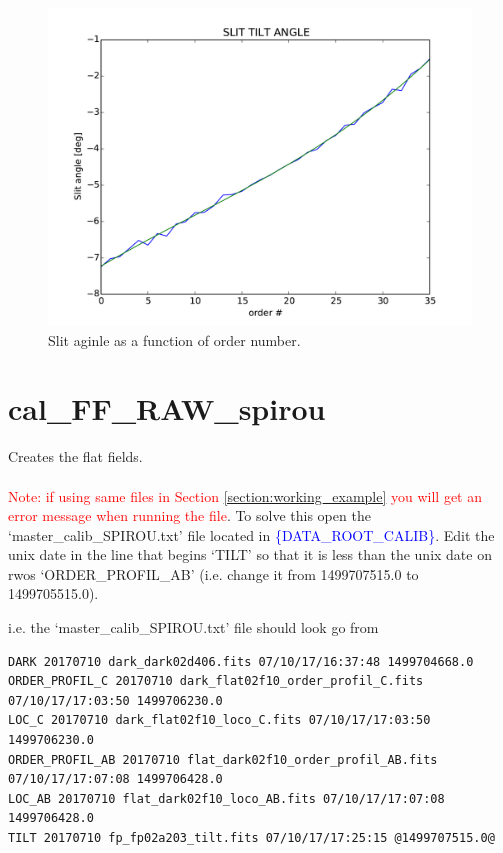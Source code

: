 \begin{figure}
\begin{center}
\includegraphics[width=.8\textwidth]{figures/cal_SLIT_spirou_2.pdf}
\caption{Slit aginle as a function of order number. \label{figure:cal_slit_spirou_2}}
\end{center}
\end{figure}

\clearpage
\newpage
\section{cal\_FF\_RAW\_spirou}
\label{section:cal_FF_RAW_spirou}

Creates the flat fields. \\ 

 \\

\noindent \textcolor{red}{Note: if using same files in Section \ref{section:working_example} you will get an error message when running the file}.
\noindent To solve this open the `master\_calib\_SPIROU.txt' file located in \textcolor{blue}{\{DATA\_ROOT\_CALIB\}}. Edit the unix date in the line that begins `TILT' so that it is less than the unix date on rwos `ORDER\_PROFIL\_AB' (i.e. change it from 1499707515.0 to 1499705515.0).

\noindent i.e. the `master\_calib\_SPIROU.txt' file should look go from
\begin{lstlisting}[style=text]
DARK 20170710 dark_dark02d406.fits 07/10/17/16:37:48 1499704668.0
ORDER_PROFIL_C 20170710 dark_flat02f10_order_profil_C.fits 07/10/17/17:03:50 1499706230.0
LOC_C 20170710 dark_flat02f10_loco_C.fits 07/10/17/17:03:50 1499706230.0
ORDER_PROFIL_AB 20170710 flat_dark02f10_order_profil_AB.fits 07/10/17/17:07:08 1499706428.0
LOC_AB 20170710 flat_dark02f10_loco_AB.fits 07/10/17/17:07:08 1499706428.0
TILT 20170710 fp_fp02a203_tilt.fits 07/10/17/17:25:15 @1499707515.0@
\end{lstlisting}

